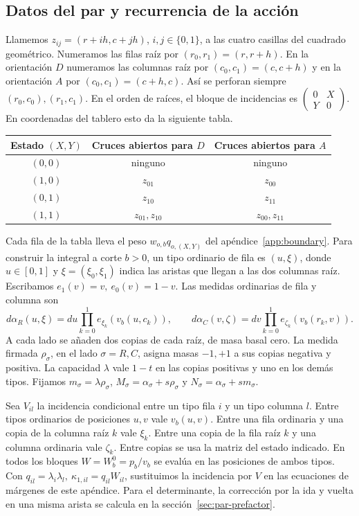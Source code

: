 \subsection{Datos del par y recurrencia de la acción}\label{sec:par-accion}

Llamemos \(z_{ij}=(r+ih,c+jh)\), \(i,j\in\{0,1\}\), a las cuatro casillas del cuadrado
geométrico. Numeramos las filas raíz por \((r_0,r_1)=(r,r+h)\). En la orientación \(D\)
numeramos las columnas raíz por \((c_0,c_1)=(c,c+h)\) y en la orientación \(A\) por
\((c_0,c_1)=(c+h,c)\). Así se perforan siempre \((r_0,c_0),(r_1,c_1)\). En el orden
de raíces, el bloque de incidencias es \(\left(\begin{smallmatrix}0&X\\Y&0\end{smallmatrix}\right)\).
En coordenadas del tablero esto da la siguiente tabla.
\begin{center}
\begin{tabular}{@{}ccc@{}}
\toprule
Estado \((X,Y)\) & Cruces abiertos para \(D\) & Cruces abiertos para \(A\)\\
\midrule
\((0,0)\)& ninguno & ninguno\\
\((1,0)\)& \(z_{01}\) & \(z_{00}\)\\
\((0,1)\)& \(z_{10}\) & \(z_{11}\)\\
\((1,1)\)& \(z_{01},z_{10}\) & \(z_{00},z_{11}\)\\
\bottomrule
\end{tabular}
\end{center}
Cada fila de la tabla lleva el peso \(w_{o,b}q_{o,(X,Y)}\) del apéndice~\ref{app:boundary}.
Para construir la integral a corte \(b>0\), un tipo ordinario de fila es \((u,\xi)\),
donde \(u\in[0,1]\) y \(\xi=(\xi_0,\xi_1)\) indica las aristas que llegan a las dos columnas
raíz. Escribamos \(e_1(v)=v,\ e_0(v)=1-v\). Las medidas ordinarias de fila y columna son
\[
 d\alpha_R(u,\xi)=du\prod_{k=0}^1 e_{\xi_k}(v_b(u,c_k)),\qquad
 d\alpha_C(v,\zeta)=dv\prod_{k=0}^1 e_{\zeta_k}(v_b(r_k,v)).
\]
A cada lado se añaden dos copias de cada raíz, de masa basal cero. La medida firmada
\(\rho_\sigma\), en el lado \(\sigma=R,C\), asigna masas \(-1,+1\) a sus copias
negativa y positiva. La capacidad \(\lambda\) vale \(1-t\) en las copias positivas y uno
en los demás tipos. Fijamos \(m_\sigma=\lambda\rho_\sigma\),
\(M_\sigma=\alpha_\sigma+s\rho_\sigma\) y \(N_\sigma=\alpha_\sigma+s m_\sigma\).

Sea \(V_{il}\) la incidencia condicional entre un tipo fila \(i\) y un tipo columna \(l\).
Entre tipos ordinarios de posiciones \(u,v\) vale \(v_b(u,v)\). Entre una fila ordinaria y
una copia de la columna raíz \(k\) vale \(\xi_k\). Entre una copia de la fila raíz \(k\) y
una columna ordinaria vale \(\zeta_k\). Entre copias se usa la matriz del estado indicado.
En todos los bloques \(W=W_b^0=p_b/v_b\) se evalúa en las posiciones de ambos tipos.
Con \(q_{il}=\lambda_i\lambda_l,\ \kappa_{1,il}=q_{il}W_{il}\), sustituimos la incidencia por \(V\)
en las ecuaciones de márgenes de este apéndice. Para el determinante, la corrección por
la ida y vuelta en una misma arista se calcula en la sección~\ref{sec:par-prefactor}.

